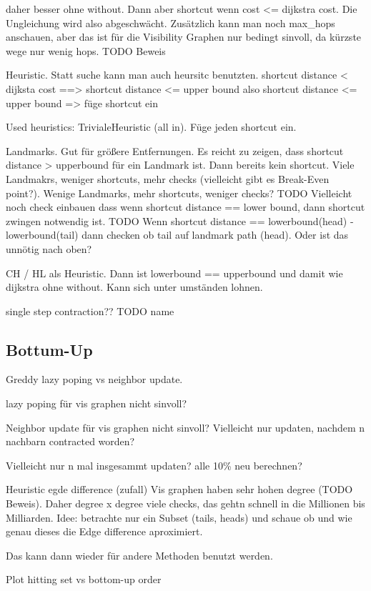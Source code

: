 daher besser ohne without. Dann aber shortcut wenn cost <= dijkstra cost.
Die Ungleichung wird also abgeschwächt.
Zusätzlich kann man noch max\_hops anschauen, aber das ist für die Visibility Graphen nur bedingt sinvoll, da kürzste wege nur wenig hops. TODO Beweis

Heuristic.
Statt suche kann man auch heursitc benutzten.
shortcut distance < dijksta cost ==> shortcut distance <= upper bound
also shortcut distance <= upper bound => füge shortcut ein

Used heuristics:
TrivialeHeuristic (all in). Füge jeden shortcut ein.

Landmarks. Gut für größere Entfernungen.
Es reicht zu zeigen, dass shortcut distance > upperbound für ein Landmark ist. Dann bereits kein shortcut.
Viele Landmakrs, weniger shortcuts, mehr checks (vielleicht gibt es Break-Even point?). Wenige Landmarks, mehr shortcuts, weniger checks?
TODO Vielleicht noch check einbauen dass wenn shortcut distance == lower bound, dann shortcut zwingen notwendig ist.
TODO Wenn shortcut distance == lowerbound(head) - lowerbound(tail) dann checken ob tail auf landmark path (head). Oder ist das unnötig nach oben?

CH / HL als Heuristic.
Dann ist lowerbound == upperbound und damit wie dijkstra ohne without. Kann sich unter umständen lohnen.


single step contraction?? TODO name

\subsection{Bottum-Up}

Greddy lazy poping vs neighbor update.

lazy poping für vis graphen nicht sinvoll?

Neighbor update für vis graphen nicht sinvoll?
Vielleicht nur updaten, nachdem n nachbarn contracted worden?

Vielleicht nur n mal insgesammt updaten? alle 10\% neu berechnen?



Heuristic egde difference (zufall)
Vis graphen haben sehr hohen degree (TODO Beweis).
Daher degree x degree viele checks, das gehtn schnell in die Millionen bis Milliarden.
Idee: betrachte nur ein Subset (tails, heads) und schaue ob und wie genau dieses die Edge difference aproximiert.

Das kann dann wieder für andere Methoden benutzt werden.

Plot hitting set vs bottom-up order


